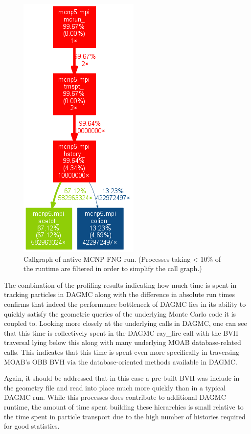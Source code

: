 \documentclass[10pt, a4paper]{article}
\begin{document}
\begin{figure}[H]
  \centering
  \caption{Callgraph of native MCNP FNG run. (Processes taking < 10\% of the runtime are filtered in order to simplify the call graph.)}
  \label{dagmc-fng-coarse}
  \includegraphics[scale=0.35]{mcnp_fng_cg_coarse.png}
\end{figure}

The combination of the profiling results indicating how much time is spent in tracking particles in DAGMC along with the difference in absolute run times confirms that indeed the performance bottleneck of DAGMC lies in its ability to quickly satisfy the geometric queries of the underlying Monte Carlo code it is coupled to. Looking more closely at the underlying calls in DAGMC, one can see that this time is collectively spent in the DAGMC ray\_fire call with the BVH traversal lying below this along with many underlying MOAB database-related calls. This indicates that this time is spent even more specifically in traversing MOAB's OBB BVH via the database-oriented methods available in DAGMC.

Again, it should be addressed that in this case a pre-built BVH was include in the geometry file and read into place much more quickly than in a typical DAGMC run. While this processes does contribute to additional DAGMC runtime, the amount of time spent building these hierarchies is small relative to the time spent in particle transport due to the high number of histories required for good statistics.
\end{document}
